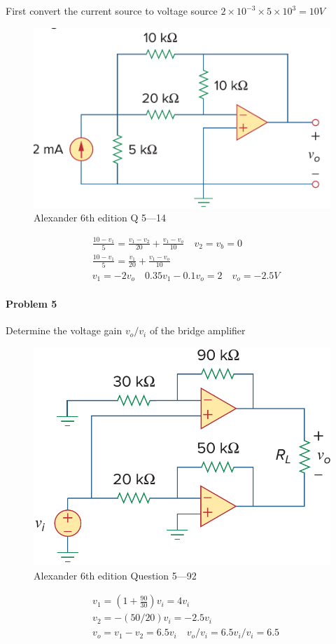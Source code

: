 First convert the current source to voltage source $2 \times 10^{-3}\times 5\times 10^3=10V$
\begin{figure}[H]
	\centering
	\includegraphics[width=1\linewidth]{images/P4Alexander6thQ5_14.png}
	\caption{Alexander 6th edition Q 5---14}
	\label{fig:p4alexander6thq514}
\end{figure}
\begin{align*}
& \frac{10-v_1}{5}=\frac{v_1-v_2}{20}+\frac{v_1-v_o}{10} \quad v_2=v_b=0\\
& \frac{10-v_1}{5}=\frac{v_1}{20}+\frac{v_1-v_o}{10} \\
& v_1=-2v_o \quad 0.35v_1 -0.1v_o=2 \quad v_o=-2.5V
\end{align*}
\paragraph{Problem 5}
Determine the voltage gain $v_o/v_i$ of the bridge amplifier
\begin{figure}[H]
	\centering
	\includegraphics[width=1\linewidth]{images/P5Alexander6thQ5_92.png}
	\caption{Alexander 6th edition Question 5---92}
	\label{fig:p5alexander6thq592}
\end{figure}

\begin{align*}
& v_1 = (1+\frac{90}{30})v_i=4v_i\\
& v_2 = -(50 / 20)v_i=-2.5v_i \\
& v_o = v_1 -v_2 = 6.5 v_i \quad v_o / v_i = 6.5 v_i / v_i = 6.5
\end{align*}